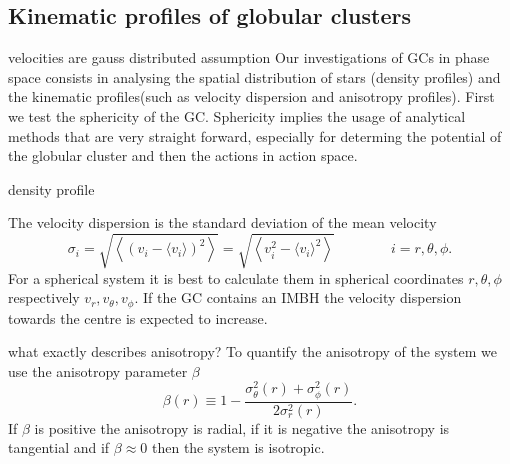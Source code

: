 \subsection{Kinematic profiles of globular clusters}\label{kin_prof_theory}
\color{red} velocities are gauss distributed assumption \color{black}
Our investigations of \acp{GC} in phase space consists in analysing the spatial distribution of stars (density profiles) and the kinematic profiles(such as velocity dispersion and anisotropy profiles). First we test the sphericity of the \ac{GC}. Sphericity implies the usage of analytical methods that are very straight forward, especially for determing the potential of the globular cluster and then the actions in action space.\par \color{red} density profile \color{black} \par The velocity dispersion is the standard deviation of the mean velocity 
\begin{equation}
\sigma_i=\sqrt{\left\langle(v_i-\langle v_i\rangle)^2\right\rangle}=\sqrt{\left\langle v_i^2-\langle v_i\rangle^2\right\rangle} \qquad\qquad i=r,\theta,\phi.
\end{equation} For a spherical system it is best to calculate them in spherical coordinates \(r,\theta,\phi\) respectively \(v_r,v_{\theta},v_{\phi}\). If the \ac{GC} contains an \ac{IMBH} the velocity dispersion towards the centre is expected to increase. 
\par \color{red} what exactly describes anisotropy? \color{black} To quantify the anisotropy of the system we use the anisotropy parameter \(\beta\) 
\begin{equation}
\beta(r)\equiv1-\frac{\sigma_\theta ^2(r)+\sigma_\phi ^2(r)}{2\sigma_r ^2(r)}.
\end{equation} If \(\beta\) is positive the anisotropy is radial, if it is negative the anisotropy is tangential and if \(\beta\approx0\) then the system is isotropic.
